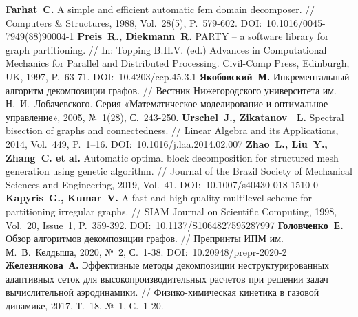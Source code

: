 \begin{thebibliography}{99}



%
\textbf{Farhat~C.} A simple and efficient automatic fem domain decomposer. // Computers \& Structures, 1988, Vol.~28(5), P.~579-602. DOI:~10.1016/0045-7949(88)90004-1
%
\textbf{Preis~R., Diekmann~R.} PARTY -- a software library for graph partitioning. // In: Topping B.H.V. (ed.) Advances in Computational Mechanics for Parallel and Distributed Processing. Civil-Comp Press, Edinburgh, UK, 1997, P.~63-71. DOI:~10.4203/ccp.45.3.1 
%
\textbf{Якобовский~М.} Инкрементальный алгоритм декомпозиции графов. // Вестник Нижегородского университета им. Н.~И.~Лобачевского. Серия «Математическое моделирование и оптимальное управление», 2005, №~1(28), С.~243-250.
%
\textbf{Urschel~J., Zikatanov~ L.} Spectral bisection of graphs and connectedness. // Linear Algebra and its Applications, 2014, Vol.~449, P.~1–16. DOI:~10.1016/j.laa.2014.02.007
%
\textbf{Zhao~L., Liu~Y., Zhang~C. et al.} Automatic optimal block decomposition for structured mesh generation using genetic algorithm. // Journal of the Brazil Society of Mechanical Sciences and Engineering, 2019, Vol.~41. DOI:~10.1007/s40430-018-1510-0
%
\textbf{Kapyris~G., Kumar~V.} A fast and high quality multilevel scheme for partitioning irregular graphs. // SIAM Journal on Scientific Computing, 1998, Vol.~20, Issue~1, P.~359-392. DOI:~10.1137/S1064827595287997
%
\textbf{Головченко~Е.} Обзор алгоритмов декомпозиции графов. // Препринты ИПМ им. М.~В.~Келдыша, 2020, №~2, С.~1-38. DOI:~10.20948/prepr-2020-2
%
\textbf{Железнякова~А.} Эффективные методы декомпозиции неструктурированных адаптивных сеток для высокопроизводительных расчетов при решении задач вычислительной аэродинамики. // Физико-химическая кинетика в газовой динамике, 2017, Т.~18, №~1, С.~1-20.
%




\end{thebibliography}
